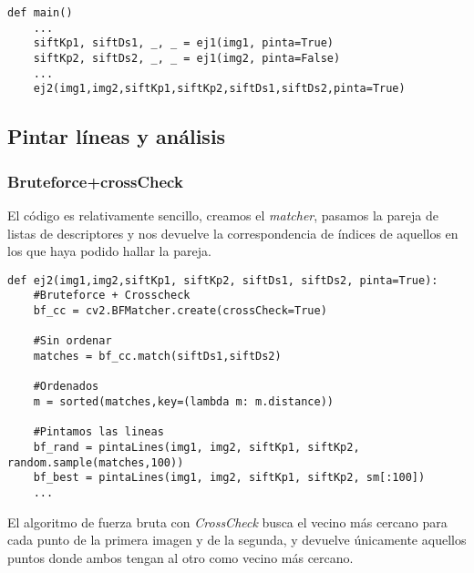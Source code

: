 \documentclass{article}
\begin{document}
\begin{lstlisting}
def main()
    ...
    siftKp1, siftDs1, _, _ = ej1(img1, pinta=True)
    siftKp2, siftDs2, _, _ = ej1(img2, pinta=False)
    ...
    ej2(img1,img2,siftKp1,siftKp2,siftDs1,siftDs2,pinta=True)
\end{lstlisting}

\subsection{Pintar líneas y análisis}

\subsubsection{Bruteforce+crossCheck}

El código es relativamente sencillo, creamos el \textit{matcher}, pasamos la pareja de listas de descriptores y nos devuelve la correspondencia de índices de aquellos en los que haya podido hallar la pareja. 

\begin{lstlisting}
def ej2(img1,img2,siftKp1, siftKp2, siftDs1, siftDs2, pinta=True):
    #Bruteforce + Crosscheck
    bf_cc = cv2.BFMatcher.create(crossCheck=True)
    
    #Sin ordenar
    matches = bf_cc.match(siftDs1,siftDs2)
    
    #Ordenados
    m = sorted(matches,key=(lambda m: m.distance))
    
    #Pintamos las lineas
    bf_rand = pintaLines(img1, img2, siftKp1, siftKp2, random.sample(matches,100))
    bf_best = pintaLines(img1, img2, siftKp1, siftKp2, sm[:100])
    ...
\end{lstlisting}

El algoritmo de fuerza bruta con \textit{CrossCheck} busca el vecino más cercano para cada punto de la primera imagen y de la segunda, y devuelve únicamente aquellos puntos donde ambos tengan al otro como vecino más cercano.
\end{document}
